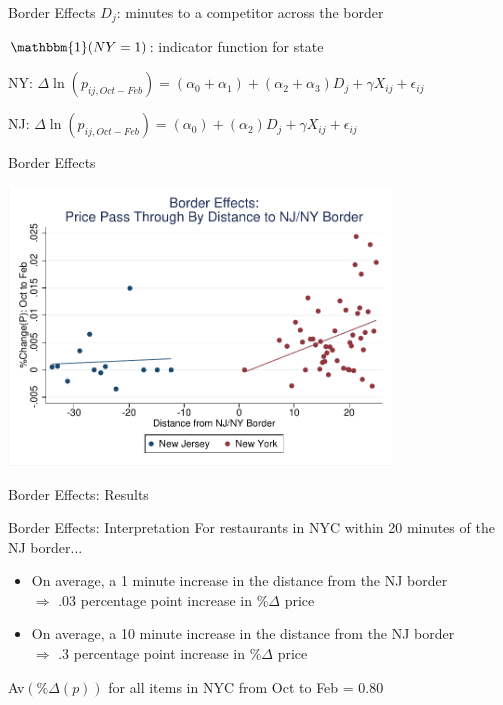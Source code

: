 \documentclass[xcolor=table]{beamer}
\begin{document}
\begin{spacing}{1.2}
\begin{frame}{Border Effects}
$D_j$: minutes to a competitor across the border

$\mathbbm{1}(NY=1)$: indicator function for state

\bigskip

\begin{centering}

NY: $
\Delta \ln (p_{ij,Oct-Feb})  = (\alpha_0 +\alpha_1) +  (\alpha_2 + \alpha_3) D_j +\gamma X_{ij}  + \epsilon_{ij}   
$

\bigskip

NJ:
$
\Delta \ln (p_{ij,Oct-Feb})  = (\alpha_0 ) +  (\alpha_2 ) D_j +\gamma X_{ij}  + \epsilon_{ij}   
$

\end{centering}
\end{frame}

\begin{frame}{Border Effects}

\centering
\includegraphics[width=4in]{total_pricechange_dist_nynj.pdf}
\end{frame}

\begin{frame}{Border Effects: Results}
\centering
\tiny


\end{frame}

\begin{frame}{Border Effects: Interpretation}
For restaurants in NYC within 20 minutes of the NJ border...
\begin{itemize}
\item On average, a 1 minute increase in the distance from the NJ border \\ $\Rightarrow$ .03 percentage point increase in $\%\Delta$ price 
\item On average, a 10 minute increase in the distance from the NJ border \\ $\Rightarrow$ .3 percentage point increase in $\%\Delta$ price 
\end{itemize}
Av$(\%\Delta(p))$ for all items in NYC from Oct to Feb = 0.80


\end{frame}
\end{spacing}
\end{document}
